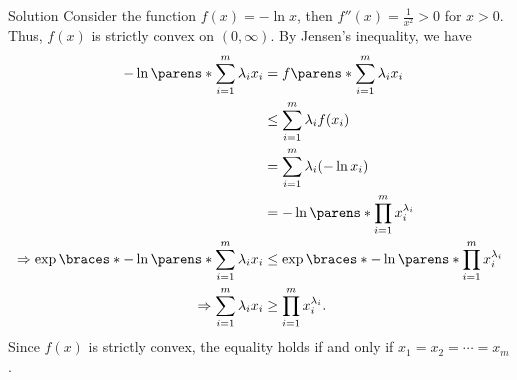 \documentclass{article}
\theoremstyle{plain}
\theoremstyle{definition}
\theoremstyle{remark}
\begin{document}
\begin{solution}
    {Solution}
    Consider the function $f(x)=-\ln x$, then $f''(x)=\frac{1}{x^2}>0$ for $x>0$. Thus, $f(x)$ is strictly convex on $(0,\infty)$. By Jensen's inequality, we have {
        \begin{align*}
            -\ln\parens*{\sum_{i=1}^{m}\lambda_ix_i}
            &= f\parens*{\sum_{i=1}^{m}\lambda_ix_i}\\
            &\leq \sum_{i=1}^{m}\lambda_i f(x_i)\\
            &= \sum_{i=1}^{m}\lambda_i(-\ln x_i)\\
            &= -\ln\parens*{\prod_{i=1}^{m}x_i^{\lambda_i}} \\
            \Rightarrow
            \exp\braces*{-\ln\parens*{\sum_{i=1}^{m}\lambda_ix_i}}
            &\leq \exp\braces*{-\ln\parens*{\prod_{i=1}^{m}x_i^{\lambda_i}}}\\
            \Rightarrow
            \sum_{i=1}^{m}\lambda_ix_i &\geq \prod_{i=1}^{m}x_i^{\lambda_i}.
        \end{align*}
    }
    Since $f(x)$ is strictly convex, the equality holds if and only if $x_1=x_2=\cdots=x_m$.
\end{solution}
\end{document}
